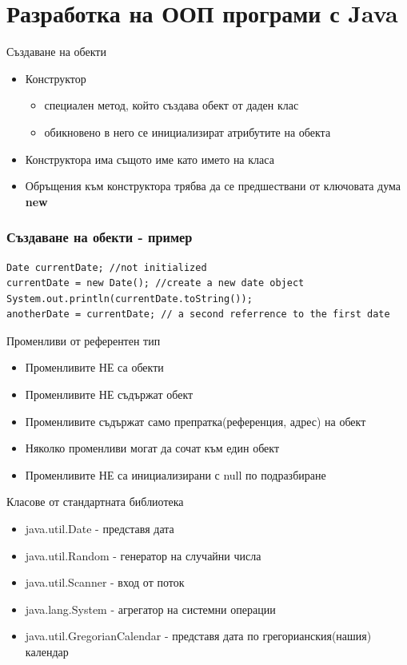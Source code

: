 \documentclass{beamer}
\begin{document}
\section{Разработка на ООП програми с Java}
\begin{frame}{Създаване на обекти}
  \transdissolve
  \begin{itemize}
  \item Конструктор \pause
    \begin{itemize}
    \item специален метод, който създава обект от даден клас \pause
    \item обикновено в него се инициализират атрибутите на обекта \pause
    \end{itemize}
  \item Конструктора има същото име като името на класа \pause
  \item Обръщения към конструктора трябва да се предшествани от
    ключовата дума
    \textbf{new}
  \end{itemize}
\end{frame}

\begin{frame}[fragile]
  \frametitle{Създаване на обекти - пример}
  \transdissolve
\begin{lstlisting}
Date currentDate; //not initialized
currentDate = new Date(); //create a new date object
System.out.println(currentDate.toString());
anotherDate = currentDate; // a second referrence to the first date
\end{lstlisting}
\end{frame}

\begin{frame}{Променливи от референтен тип}
  \transdissolve
  \begin{itemize}
  \item Променливите \alert{НЕ} са обекти \pause
  \item Променливите \alert{НЕ} съдържат обект \pause
  \item Променливите \alert{съдържат само препратка(референция,
      адрес)} на обект \pause
  \item Няколко променливи могат да сочат към
    един обект \pause
  \item Променливите \alert{НЕ} са инициализирани с
    null по подразбиране
  \end{itemize}
\end{frame}

\begin{frame}{Класове от стандартната библиотека}
  \transdissolve
  \begin{itemize}
  \item java.util.Date -  представя дата
  \item java.util.Random - генератор на случайни числа
  \item java.util.Scanner - вход от поток
  \item java.lang.System - агрегатор на системни
    операции
  \item java.util.GregorianCalendar - представя дата по
    грегорианския(нашия) календар
  \end{itemize}
\end{frame}
\end{document}
